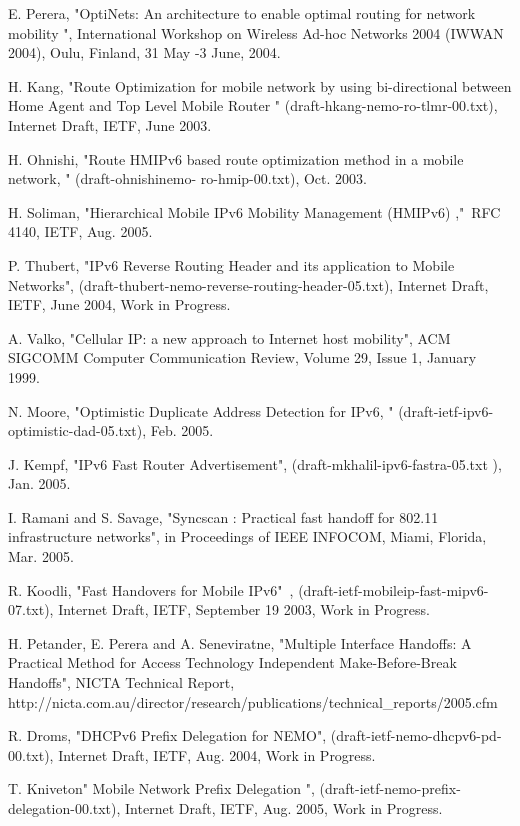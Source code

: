 \begin{thebibliography}{99}
E. Perera, "OptiNets: An architecture to enable optimal routing for
network mobility ", International Workshop on Wireless Ad-hoc
Networks 2004 (IWWAN 2004), Oulu, Finland, 31 May -3 June, 2004.

H. Kang, "Route Optimization for mobile network by using
bi-directional between Home Agent and Top Level Mobile Router "
(draft-hkang-nemo-ro-tlmr-00.txt), Internet Draft, IETF, June 2003.

H. Ohnishi, "Route HMIPv6 based route optimization method in a
mobile network, " (draft-ohnishinemo- ro-hmip-00.txt), Oct. 2003.

H. Soliman, "Hierarchical Mobile IPv6 Mobility Management (HMIPv6)
,"\ RFC 4140, IETF, Aug. 2005.

P. Thubert, "IPv6 Reverse Routing Header and its application to
Mobile Networks",
(draft-thubert-nemo-reverse-routing-header-05.txt), Internet Draft,
IETF, June 2004, Work in Progress.

A. Valko, "Cellular IP: a new approach to Internet host mobility",
ACM SIGCOMM Computer Communication Review, Volume 29, Issue 1,
January 1999.

N. Moore, "Optimistic Duplicate Address Detection for IPv6, "
(draft-ietf-ipv6-optimistic-dad-05.txt), Feb. 2005.

J. Kempf, "IPv6 Fast Router Advertisement",
(draft-mkhalil-ipv6-fastra-05.txt ), Jan. 2005.

I. Ramani and S. Savage, "Syncscan : Practical fast handoff for
802.11 infrastructure networks", in Proceedings of IEEE INFOCOM,
Miami, Florida, Mar. 2005.

R. Koodli, "Fast Handovers for Mobile IPv6"\ ,
(draft-ietf-mobileip-fast-mipv6-07.txt), Internet Draft, IETF,
September 19 2003, Work in Progress.

H. Petander, E. Perera and A. Seneviratne, "Multiple Interface
Handoffs: A Practical Method for Access Technology Independent
Make-Before-Break Handoffs", NICTA Technical Report,
http://nicta.com.au/director/research/publications/technical\_reports/2005.cfm

R. Droms, "DHCPv6 Prefix Delegation for NEMO",
(draft-ietf-nemo-dhcpv6-pd-00.txt), Internet Draft, IETF, Aug. 2004,
Work in Progress.

T. Kniveton" Mobile Network Prefix Delegation ",
(draft-ietf-nemo-prefix-delegation-00.txt), Internet Draft, IETF,
Aug. 2005, Work in Progress.


\end{thebibliography}
